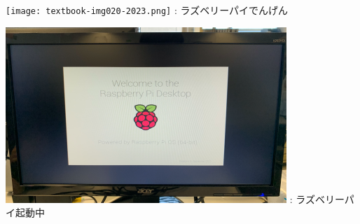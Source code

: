 \documentclass[a4paper,12pt]{jarticle}
\begin{document}
\begin{enumerate}
\begin{enumerate}
        \centering
        \begin{minipage}{\textwidth}
          \begin{minipage}{0.45\textwidth}
            \centering
            {\upshape
              \centering
              \texttt{[image: textbook-img020-2023.png]}
              \newline
              {\theFigure\label{seq:refFigure6}}:
              ラズベリーパイでんげん}
          \end{minipage}
          \begin{minipage}{0.45\textwidth}
            \centering
            {\upshape
              \centering
              \includegraphics[width=0.8\linewidth]{textbook-img0212023.png}
              \newline
              {\theFigure\label{seq:refFigure7}}:
              ラズベリーパイ起動中}
            \end{minipage}
          \end{minipage}


\clearpage
\end{enumerate}



\end{enumerate}
\end{document}
